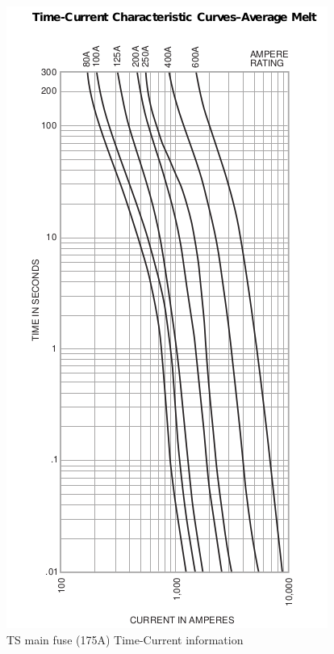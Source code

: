 \documentclass{article}
\begin{document}
            \begin{figure}[H]
                \centering
                \includegraphics[width = 0.25 \textheight]{TSfuseT-Agraph}
                \caption{TS main fuse (175A) Time-Current information}
                \label{TSi2t}
            \end{figure}

\end{document}
